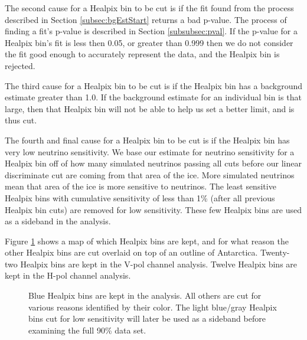 The second cause for a Healpix bin to be cut is if the fit found from the process described in Section \ref{subsec:bgEstStart} returns a bad p-value.  The process of finding a fit's p-value is described in Section \ref{subsubsec:pval}.  If the p-value for a Healpix bin's fit is less then 0.05, or greater than 0.999 then we do not consider the fit good enough to accurately represent the data, and the Healpix bin is rejected.

The third cause for a Healpix bin to be cut is if the Healpix bin has a background estimate greater than 1.0.  If the background estimate for an individual bin is that large, then that Healpix bin will not be able to help us set a better limit, and is thus cut.

The fourth and final cause for a Healpix bin to be cut is if the Healpix bin has very low neutrino sensitivity.  We base our estimate for neutrino sensitivity for a Healpix bin off of how many simulated neutrinos passing all cuts before our linear discriminate cut are coming from that area of the ice.  More simulated neutrinos mean that area of the ice is more sensitive to neutrinos.  The least sensitive Healpix bins with cumulative sensitivity of less than 1\% (after all previous Healpix bin cuts) are removed for low sensitivity.   These few Healpix bins are used as a sideband in the analysis.

Figure \ref{fig:binStatus} shows a map of which Healpix bins are kept, and for what reason the other Healpix bins are cut overlaid on top of an outline of Antarctica.  Twenty-two Healpix bins are kept in the V-pol channel analysis.  Twelve Healpix bins are kept in the H-pol channel analysis. 

\begin{figure}
\centering
    \hfill
    \caption[Healpix bin Status]{Blue Healpix bins are kept in the analysis.  All others are cut for various reasons identified by their color.  The light blue/gray Healpix bins cut for low sensitivity will later be used as a sideband before examining the full 90\% data set.}
    \label{fig:binStatus}
\end{figure}


